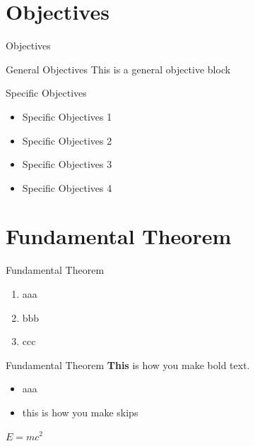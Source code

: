 \documentclass[9pt]{beamer}
\begin{document}
\section{Objectives}
\begin{frame}{Objectives}
  \begin{block}{General Objectives}
  This is a general objective block
  \end{block}

  \begin{block}{Specific Objectives}
  \begin{itemize}
      \item Specific Objectives 1
      \item Specific Objectives 2
      \item Specific Objectives 3
      \item Specific Objectives 4
  \end{itemize}
\end{block}

    
\end{frame}

\section{Fundamental Theorem}
\begin{frame}{Fundamental Theorem}
\begin{enumerate}
    \item aaa
    \item bbb
    \item ccc
\end{enumerate}
    
\end{frame}

\begin{frame}{Fundamental Theorem}
  \textbf{This} is how you make bold text.
  \medskip

  \begin{itemize}
      \item aaa
      \medskip
      \item this is how you make skips
  \end{itemize}    
  \medskip

  \begin{theorem}
    $E = mc^2$
  \end{theorem}

\end{frame}
\end{document}

